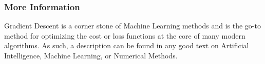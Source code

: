 \subsubsection{More Information}
Gradient Descent is a corner stone of Machine Learning methods and is the go-to method for optimizing the cost or loss functions at the core of many modern algorithms. As such, a description can be found in any good text on Artificial Intelligence, Machine Learning, or Numerical Methods.


